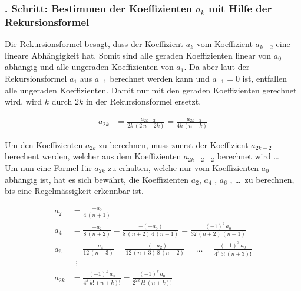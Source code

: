 \subsubsection{. Schritt: Bestimmen der Koeffizienten $a_k$ mit Hilfe der Rekursionsformel }
\begin{normalsize}%
Die Rekursionsformel  besagt,
dass der Koeffizient $a_k$ vom Koeffizient $a_{k-2}$ eine lineare Abh\"angigkeit hat.
Somit sind alle geraden Koeffizienten linear von $a_0$ abh\"angig und alle un\-geraden Koeffizienten von $a_1$.
Da aber laut der Rekursionsformel  $a_1$ aus $a_{-1}$ berechnet werden kann und $a_{-1} = 0$ ist,
entfallen alle ungeraden Koeffizienten.
Damit nur mit den geraden Koeffizienten gerechnet wird,
wird $k$ durch $2k$ in der Rekursionsformel  ersetzt.
\end{normalsize}
\begin{align}
	\nonumber
	a_{2k}
	&=
	\frac
	{
		-a_{2k - 2}
	}{
		2k \, \left( 2 \, n + 2k \right)	
	}
	=
	\frac
	{
		-a_{2k - 2}
	}{
		4k \, \left( n + k \right)	
	} 
\end{align}
\begin{normalsize}%
Um den Koeffizienten $a_{2k}$ zu berechnen,
muss zuerst der Koeffizient $a_{2k-2}$ berechent werden,
welcher aus dem Koeffizienten $a_{2k-2-2}$ berechnet wird \dots \\
Um nun eine Formel f\"ur $a_{2k}$ zu erhalten,
welche nur vom Koeffizienten $a_0$ abh\"angig ist,
hat es sich bew\"ahrt,
die Koeffizienten $a_2$, $a_4$ , $a_6$ , \dots \, zu berechnen,
bis eine Regelm\"assigkeit erkennbar ist.
\end{normalsize}
\begin{align}
	\nonumber
	a_2
	&=
	\frac
	{
		-a_0
	}{
		4 \, \left( n + 1 \right)	
	}
	\\
	\nonumber
	a_4
	&=
	\frac
	{
		-a_{2}
	}{
		8 \, \left( n + 2 \right)	
	}
	=
	\frac
	{
		- \left( - a_{0} \right)
	}{
		8 \, \left( n + 2 \right) \, 4 \, \left( n + 1 \right)
	}
	=
	\frac
	{
		\left( -1 \right) ^2 \, a_{0}
	}{
		32 \, \left( n + 2 \right) \, \left( n + 1 \right)
	}
	\\
	\nonumber
	a_6
	&=
	\frac
	{
		-a_{4}
	}{
		12 \, \left( n + 3 \right)	
	}
	=
	\frac
	{
		- \left( - a_{2} \right)
	}{
		12 \, \left( n + 3 \right) \, 8 \, \left( n + 2 \right)
	}
	=
	\dots
	=
	\frac
	{
		\left( -1 \right) ^3 \, a_{0}
	}{
		4^3 \, {3}! \, {\left( n + 3 \right)}!
	}
	\\
	\nonumber
	& \, \, \, \vdots
	\\
	a_{2k}
	&=	
	\frac
	{
		\left( -1 \right) ^k \, a_0 
	}{
		4^k \, {k}! \, {\left( n + k \right)}!
	}
	=
	\frac
	{
		\left( -1 \right) ^k \, a_0
	}{
		2^{2k} \, {k}! \, {\left( n + k \right)}!
	}
	\label{eq:bessel:koeffizienten:gerade}
\end{align}
